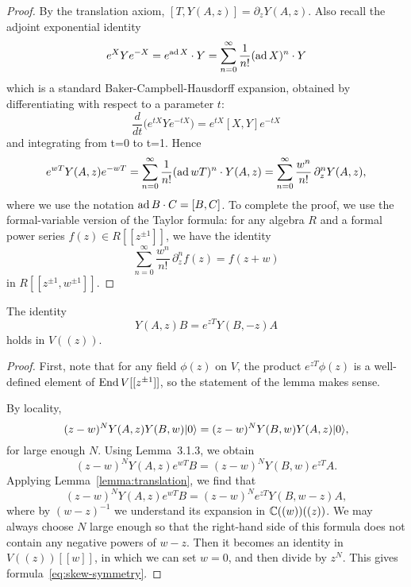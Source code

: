 \documentclass[12pt]{article}
\begin{document}
\begin{proof}
By the translation axiom, $[T,Y(A,z)] = \partial_z Y(A,z)$. Also recall the adjoint exponential identity \begin{align*}
    e^{X}Ye^{-X} = e^{\operatorname{ad} X} \cdot Y = \sum_{n=0}^\infty \frac{1}{n!} (\operatorname{ad} X)^n \cdot Y
\end{align*} which is a standard Baker-Campbell-Hausdorff expansion, obtained by differentiating with respect to a parameter $t$:
\[\frac{d}{dt}\big(e^{tX} Y e^{-tX}\big) = e^{tX}[X,Y]e^{-tX}\]
and integrating from t=0 to t=1.
Hence
\[
e^{wT} Y(A,z) e^{-wT}
= \sum_{n=0}^\infty \frac{1}{n!} (\operatorname{ad} wT)^n \cdot Y(A,z)
= \sum_{n=0}^\infty \frac{w^n}{n!}\,\partial_z^n Y(A,z),
\]
where we use the notation $\operatorname{ad} B \cdot C = [B,C]$.
To complete the proof, we use the formal-variable version of the Taylor formula:
for any algebra $R$ and a formal power series $f(z) \in R[[z^{\pm1}]]$, we have the identity
\[
\sum_{n=0}^\infty \frac{w^n}{n!}\,\partial_z^n f(z) = f(z+w)
\]
in $R[[z^{\pm1},w^{\pm1}]]$.
\end{proof}

\begin{proposition}
\label{prop:skew-symmetry}
The identity
\begin{equation}
\label{eq:skew-symmetry}
Y(A,z)B = e^{zT} Y(B,-z)A
\end{equation}
holds in $V((z))$.
\end{proposition}

\begin{proof}
First, note that for any field $\phi(z)$ on $V$, the product $e^{zT}\phi(z)$ is a well-defined element of $\operatorname{End} V[[z^{\pm1}]]$, so the statement of the lemma makes sense.

By locality,
\[
(z-w)^N Y(A,z)Y(B,w)\lvert 0 \rangle = (z-w)^N Y(B,w)Y(A,z)\lvert 0 \rangle,
\]
for large enough $N$. Using Lemma~3.1.3, we obtain
\[
(z-w)^N Y(A,z) e^{wT} B = (z-w)^N Y(B,w) e^{zT} A.
\]
Applying Lemma~\ref{lemma:translation}, we find that
\[
(z-w)^N Y(A,z)e^{wT}B = (z-w)^N e^{zT} Y(B,w-z)A,
\]
where by $(w-z)^{-1}$ we understand its expansion in $\mathbb{C}((w))((z))$.
We may always choose $N$ large enough so that the right-hand side
of this formula does not contain any negative powers of $w-z$.
Then it becomes an identity in $V((z))[[w]]$, in which we can set $w=0$,
and then divide by $z^N$. This gives formula~\eqref{eq:skew-symmetry}.
\end{proof}
\end{document}

